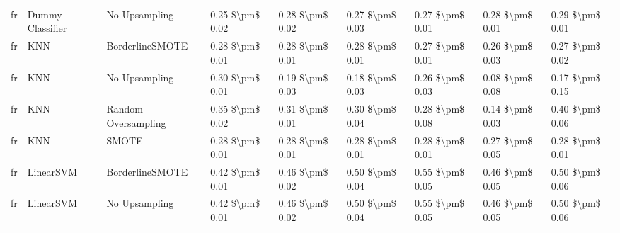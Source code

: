 \begin{tabular}{lllllllll}
      fr &                Dummy Classifier &                 No Upsampling & 0.25 \$\textbackslash pm\$ 0.02 &           0.28 \$\textbackslash pm\$ 0.02 &       0.27 \$\textbackslash pm\$ 0.03 &        0.27 \$\textbackslash pm\$ 0.01 &                         0.28 \$\textbackslash pm\$ 0.01 &     0.29 \$\textbackslash pm\$ 0.01 \\
      fr &                             KNN &               BorderlineSMOTE & 0.28 \$\textbackslash pm\$ 0.01 &           0.28 \$\textbackslash pm\$ 0.01 &       0.28 \$\textbackslash pm\$ 0.01 &        0.27 \$\textbackslash pm\$ 0.01 &                         0.26 \$\textbackslash pm\$ 0.03 &     0.27 \$\textbackslash pm\$ 0.02 \\
      fr &                             KNN &                 No Upsampling & 0.30 \$\textbackslash pm\$ 0.01 &           0.19 \$\textbackslash pm\$ 0.03 &       0.18 \$\textbackslash pm\$ 0.03 &        0.26 \$\textbackslash pm\$ 0.03 &                         0.08 \$\textbackslash pm\$ 0.08 &     0.17 \$\textbackslash pm\$ 0.15 \\
      fr &                             KNN &           Random Oversampling & 0.35 \$\textbackslash pm\$ 0.02 &           0.31 \$\textbackslash pm\$ 0.01 &       0.30 \$\textbackslash pm\$ 0.04 &        0.28 \$\textbackslash pm\$ 0.08 &                         0.14 \$\textbackslash pm\$ 0.03 &     0.40 \$\textbackslash pm\$ 0.06 \\
      fr &                             KNN &                         SMOTE & 0.28 \$\textbackslash pm\$ 0.01 &           0.28 \$\textbackslash pm\$ 0.01 &       0.28 \$\textbackslash pm\$ 0.01 &        0.28 \$\textbackslash pm\$ 0.01 &                         0.27 \$\textbackslash pm\$ 0.05 &     0.28 \$\textbackslash pm\$ 0.01 \\
      fr &                       LinearSVM &               BorderlineSMOTE & 0.42 \$\textbackslash pm\$ 0.01 &           0.46 \$\textbackslash pm\$ 0.02 &       0.50 \$\textbackslash pm\$ 0.04 &        0.55 \$\textbackslash pm\$ 0.05 &                         0.46 \$\textbackslash pm\$ 0.05 &     0.50 \$\textbackslash pm\$ 0.06 \\
      fr &                       LinearSVM &                 No Upsampling & 0.42 \$\textbackslash pm\$ 0.01 &           0.46 \$\textbackslash pm\$ 0.02 &       0.50 \$\textbackslash pm\$ 0.04 &        0.55 \$\textbackslash pm\$ 0.05 &                         0.46 \$\textbackslash pm\$ 0.05 &     0.50 \$\textbackslash pm\$ 0.06 \\

\end{tabular}
